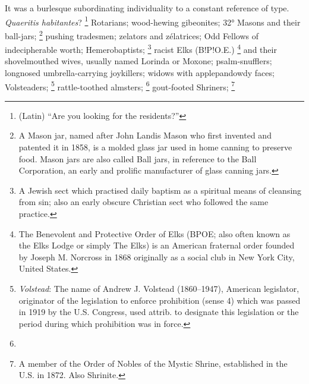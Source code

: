   It was a burlesque 
subordinating individuality to a constant reference of type. 
\textit{Quaeritis habitantes}?
\footnote{ (Latin) “Are you looking for the residents?”}
Rotarians; 
wood-hewing gibeonites; 
32° Masons and their ball-jars; 
\footnote{ A Mason jar, named after John Landis Mason who first invented and
patented it in 1858, is a molded glass jar used in home canning to preserve
food. Mason jars are also called Ball jars, in reference to the Ball
Corporation, an early and prolific manufacturer of glass canning jars.
}
pushing tradesmen; zelators and zélatrices; 
Odd Fellows of indecipherable worth; Hemerobaptists; 
\footnote{ A Jewish sect which practised daily baptism as a spiritual means of
cleansing from sin; also an early obscure Christian sect who followed the same
practice. 
}
racist Elks (B!P!O.E.) 
\footnote{The Benevolent and Protective Order of Elks (BPOE; also often known as
  the Elks Lodge or simply The Elks) is an American fraternal order founded by
  Joseph M. Norcross in 1868 originally as a social club in New York City, 
  United States.}
and their shovelmouthed wives, usually named Lorinda or Moxone; psalm-snufflers; 
longnosed umbrella-carrying joykillers; widows with applepandowdy 
faces; Volsteaders;
\footnote{ \textit{Volstead}: The name of Andrew J. Volstead (1860–1947),
American legislator, originator of the legislation to enforce prohibition (sense
4) which was passed in 1919 by the U.S. Congress, used attrib. to designate this
legislation or the period during which prohibition was in force. 
}
rattle-toothed almsters; 
\footnote{ \textdbend}
gout-footed Shriners; 
\footnote{ A member of the Order of Nobles of the Mystic Shrine, established in
  the U.S. in 1872. Also Shrinite. }

